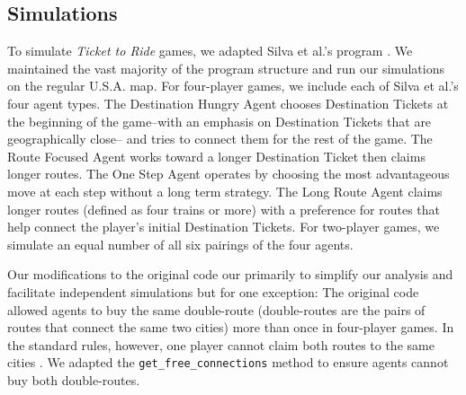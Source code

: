 \subsection{Simulations}
To simulate \textit{Ticket to Ride} games, we adapted Silva et al.'s program
\cite{silva2019, witter2019}.
We maintained the vast majority of the program structure and run our simulations
on the regular U.S.A. map.
For four-player games, we include each of Silva et al.'s four agent types.
The Destination Hungry Agent chooses Destination Tickets at the beginning of the
game--with an emphasis on Destination Tickets that are geographically close--
and tries to connect them for the rest of the game.
The Route Focused Agent works toward a longer Destination Ticket then
claims longer routes.
The One Step Agent operates by choosing the most advantageous move at each
step without a long term strategy.
The Long Route Agent claims longer routes (defined as four trains or more)
with a preference for routes that help connect the player's initial Destination Tickets.
For two-player games, we simulate an equal number of all six pairings of the four
agents. 

Our modifications to the original code our primarily to simplify
our analysis and facilitate independent simulations but for one exception:
The original code allowed agents to buy the same double-route 
(double-routes are the pairs of routes that connect the same two cities)
more than once in four-player games.
In the standard rules, however, one player
cannot claim both routes to the same cities \cite{moon2004ticket}.
We adapted the \texttt{get\_free\_connections} method to ensure
agents cannot buy both double-routes.
